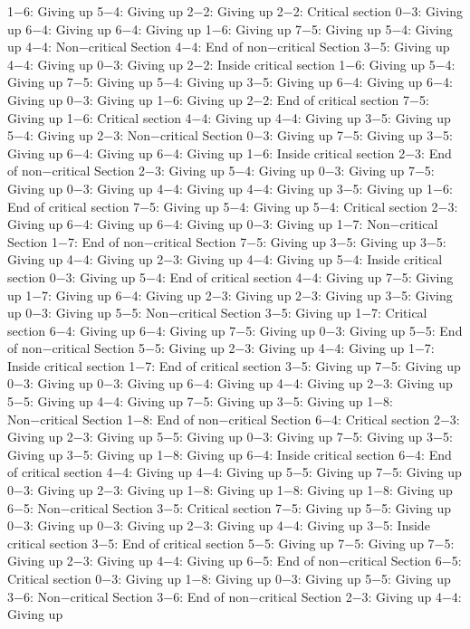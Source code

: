 1−6: Giving up
5−4: Giving up
2−2: Giving up
2−2: Critical section
0−3: Giving up
6−4: Giving up
6−4: Giving up
1−6: Giving up
7−5: Giving up
5−4: Giving up
4−4: Non−critical Section
4−4: End of non−critical Section
3−5: Giving up
4−4: Giving up
0−3: Giving up
2−2: Inside critical section
1−6: Giving up
5−4: Giving up
7−5: Giving up
5−4: Giving up
3−5: Giving up
6−4: Giving up
6−4: Giving up
0−3: Giving up
1−6: Giving up
2−2: End of critical section
7−5: Giving up
1−6: Critical section
4−4: Giving up
4−4: Giving up
3−5: Giving up
5−4: Giving up
2−3: Non−critical Section
0−3: Giving up
7−5: Giving up
3−5: Giving up
6−4: Giving up
6−4: Giving up
1−6: Inside critical section
2−3: End of non−critical Section
2−3: Giving up
5−4: Giving up
0−3: Giving up
7−5: Giving up
0−3: Giving up
4−4: Giving up
4−4: Giving up
3−5: Giving up
1−6: End of critical section
7−5: Giving up
5−4: Giving up
5−4: Critical section
2−3: Giving up
6−4: Giving up
6−4: Giving up
0−3: Giving up
1−7: Non−critical Section
1−7: End of non−critical Section
7−5: Giving up
3−5: Giving up
3−5: Giving up
4−4: Giving up
2−3: Giving up
4−4: Giving up
5−4: Inside critical section
0−3: Giving up
5−4: End of critical section
4−4: Giving up
7−5: Giving up
1−7: Giving up
6−4: Giving up
2−3: Giving up
2−3: Giving up
3−5: Giving up
0−3: Giving up
5−5: Non−critical Section
3−5: Giving up
1−7: Critical section
6−4: Giving up
6−4: Giving up
7−5: Giving up
0−3: Giving up
5−5: End of non−critical Section
5−5: Giving up
2−3: Giving up
4−4: Giving up
1−7: Inside critical section
1−7: End of critical section
3−5: Giving up
7−5: Giving up
0−3: Giving up
0−3: Giving up
6−4: Giving up
4−4: Giving up
2−3: Giving up
5−5: Giving up
4−4: Giving up
7−5: Giving up
3−5: Giving up
1−8: Non−critical Section
1−8: End of non−critical Section
6−4: Critical section
2−3: Giving up
2−3: Giving up
5−5: Giving up
0−3: Giving up
7−5: Giving up
3−5: Giving up
3−5: Giving up
1−8: Giving up
6−4: Inside critical section
6−4: End of critical section
4−4: Giving up
4−4: Giving up
5−5: Giving up
7−5: Giving up
0−3: Giving up
2−3: Giving up
1−8: Giving up
1−8: Giving up
1−8: Giving up
6−5: Non−critical Section
3−5: Critical section
7−5: Giving up
5−5: Giving up
0−3: Giving up
0−3: Giving up
2−3: Giving up
4−4: Giving up
3−5: Inside critical section
3−5: End of critical section
5−5: Giving up
7−5: Giving up
7−5: Giving up
2−3: Giving up
4−4: Giving up
6−5: End of non−critical Section
6−5: Critical section
0−3: Giving up
1−8: Giving up
0−3: Giving up
5−5: Giving up
3−6: Non−critical Section
3−6: End of non−critical Section
2−3: Giving up
4−4: Giving up
